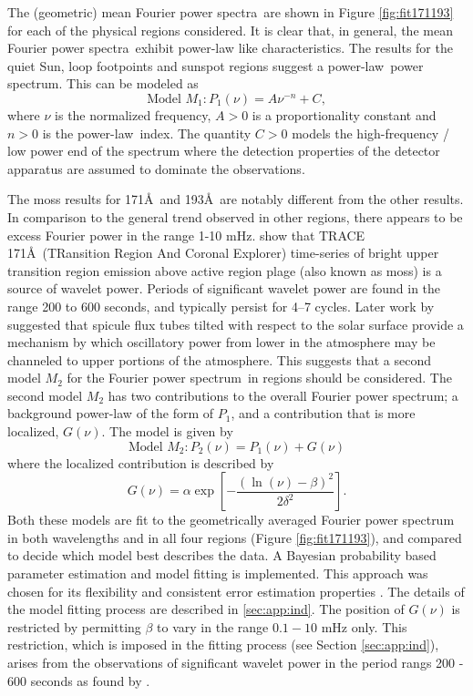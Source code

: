 \documentclass[onecolumn]{emulateapj}
\newcommand{\PS}{power spectrum}
\newcommand{\PA}{power spectra}
\newcommand{\PL}{power-law}
\newcommand{\Fps}{Fourier \PS}
\newcommand{\mFpa}{mean Fourier \PA}
\begin{document}
The (geometric) \mFpa\ are shown in Figure \ref{fig:fit171193} for
each of the physical regions considered.  It is clear that, in
general, the \mFpa\ exhibit power-law like characteristics.  The
results for the quiet Sun, loop footpoints and sunspot regions suggest
a \PL\ \PS.  This can be modeled as
\begin{equation}
\label{eqn:pwrlaw}
\mbox{Model $M_{1}$}: P_{1}(\nu) = A\nu^{-n} + C,
\end{equation}
where $\nu$ is the normalized frequency, $A>0$ is a proportionality
constant and $n>0$ is the \PL\ index.  The quantity $C>0$ models
the high-frequency / low power end of the spectrum where the detection
properties of the detector apparatus are assumed to dominate the
observations.

The moss results for 171\AA\ and 193\AA\ are notably different from
the other results.  In comparison to the general trend observed in
other regions, there appears to be excess Fourier power in the range
1-10 mHz.  \cite{2003ApJ...595L..63D} show that TRACE
171\AA\ (TRansition Region And Coronal Explorer) time-series of bright
upper transition region emission above active region plage (also known
as moss) is a source of wavelet power. Periods of significant wavelet
power are found in the range 200 to 600 seconds, and typically persist
for 4–7 cycles.  Later work by \cite{2005ApJ...624L..61D} suggested
that spicule flux tubes tilted with respect to the solar surface
provide a mechanism by which oscillatory power from lower in the
atmosphere may be channeled to upper portions of the atmosphere.  This
suggests that a second model $M_{2}$ for the \Fps\ in regions should
be considered.  The second model $M_{2}$ has two contributions to the
overall \Fps; a background power-law of the form of $P_{1}$, and a
contribution that is more localized, $G(\nu)$.  The model is given by
\begin{equation}
\label{eqn:pwrlawbump}
\mbox{Model $M_{2}$}: P_{2}(\nu) = P_{1}(\nu) + G(\nu)
\end{equation}
where the localized contribution is described by
\begin{equation}
\label{eqn:bump}
G(\nu) = \alpha\exp\left[-\frac{(\ln(\nu)-\beta)^{2}}{2\delta^{2}}\right].
\end{equation}
Both these models are fit to the geometrically averaged Fourier power
spectrum in both wavelengths and in all four regions (Figure
\ref{fig:fit171193}), and compared to decide which model best
describes the data. A Bayesian probability based parameter estimation
and model fitting is implemented.  This approach was chosen for its
flexibility and consistent error estimation properties
\citep{2013ApJ...769...89I}.  The details of the model fitting process
are described in \ref{sec:app:ind}.  The position of $G(\nu)$ is
restricted by permitting $\beta$ to vary in the range $0.1-10$ mHz
only.  This restriction, which is imposed in the fitting process (see
Section \ref{sec:app:ind}), arises from the observations of
significant wavelet power in the period rangs 200 - 600 seconds as
found by \cite{2003ApJ...595L..63D}.
\end{document}
